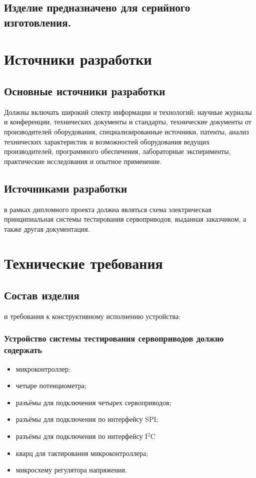 \documentclass[a4paper]{bsuir-tor}
\begin{document}
  \subsection{Изделие предназначено для серийного изготовления.}

\section{Источники разработки}


\subsection{Основные источники разработки}
Должны включать широкий спектр информации и технологий: научные
журналы и конференции, технических документы и стандарты, технические
документы от производителей оборудования, специализированные
источники, патенты, анализ технических характеристик и возможностей
оборудования ведущих производителей, программного обеспечения,
лабораторные эксперименты, практические исследования и опытное
применение.

\subsection{Источниками разработки}
в рамках дипломного проекта должна являться схема электрическая
принципиальная системы тестирования сервоприводов, выданная
заказчиком, а также другая документация.

\section{Технические требования}

\subsection{Состав изделия} и требования к конструктивному исполнению
устройства:

\subsubsection{Устройство системы тестирования сервоприводов должно содержать}

\begin{itemize}
\item микроконтроллер;
\item четыре потенциометра;
\item разъёмы для подключения четырех сервоприводов;
\item разъёмы для подключения по интерфейсу SPI;
\item разъёмы для подключения по интерфейсу I$^2$C
  
\item кварц для тактирования микроконтроллера;  
\item микросхему регулятора напряжения.
\end{itemize}
\end{document}
